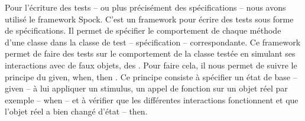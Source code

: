 Pour l'écriture des tests -- ou plus précisément des spécifications -- nous
avons utilisé le framework Spock. C'est un framework pour écrire des tests sous
forme de spécifications. Il permet de spécifier le comportement de chaque méthode d'une
classe dans la classe de test -- spécification -- correspondante. Ce framework permet de faire
des tests sur le comportement de la classe testée en simulant ses interactions
avec de faux objets, des . Pour faire cela, il nous permet de suivre
le principe du \og given, when, then \fg{}. Ce principe consiste à spécifier un
état de base -- given -- à lui appliquer un stimulus, un appel de fonction sur un
objet réel par exemple -- when -- et à vérifier que les différentes
interactions fonctionnent et que l'objet réel a bien changé d'état -- then.



